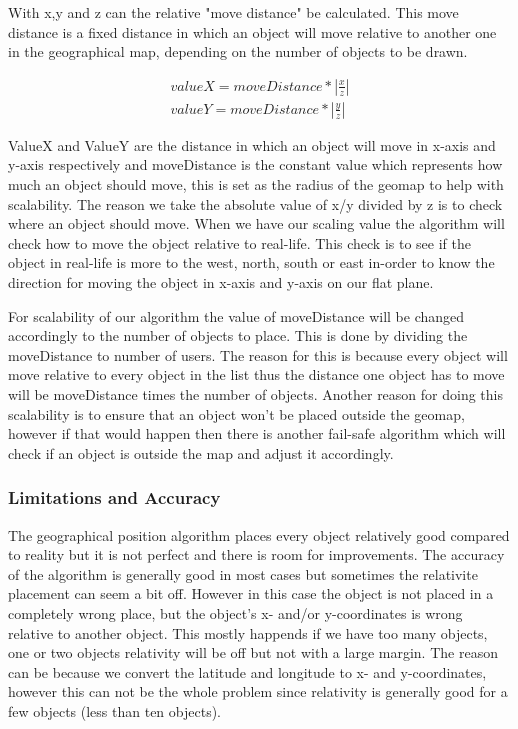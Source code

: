 \documentclass[9pt,a4paper]{acmproc}
\begin{document}
With x,y and z can the relative "move distance" be calculated. This move distance is a fixed distance in which an object will move relative to another one in the geographical map, depending on the number of objects to be drawn.

\begin{align*}
\label{eq:2}
valueX = moveDistance*|\frac{x}{z}| \\
valueY = moveDistance*|\frac{y}{z}|
\end{align*}

ValueX and ValueY are the distance in which an object will move in x-axis and y-axis respectively and moveDistance is the constant value which represents how much an object should move, this is set as the radius of the geomap to help with scalability. The reason we take the absolute value of x/y divided by z is to check where an object should move. When we have our scaling value the algorithm will check how to move the object relative to real-life. This check is to see if the object in real-life is more to the west, north, south or east in-order to know the direction for moving the object in x-axis and y-axis on our flat plane.

For scalability of our algorithm the value of moveDistance will be changed accordingly to the number of objects to place. This is done by dividing the moveDistance to number of users. The reason for this is because every object will move relative to every object in the list thus the distance one object has to move will be moveDistance times the number of objects. Another reason for doing this scalability is to ensure that an object won't be placed outside the geomap, however if that would happen then there is another fail-safe algorithm which will check if an object is outside the map and adjust it accordingly.

\subsubsection{Limitations and Accuracy}
The geographical position algorithm places every object relatively good compared to reality but it is not perfect and there is room for improvements. The accuracy of the algorithm is generally good in most cases but sometimes the relativite placement can seem a bit off. However in this case the object is not placed in a completely wrong place, but the object's x- and/or y-coordinates is wrong relative to another object. This mostly happends if we have too many objects, one or two objects relativity will be off but not with a large margin. The reason can be because we convert the latitude and longitude to x- and y-coordinates, however this can not be the whole problem since relativity is generally good for a few objects (less than ten objects).
\end{document}

